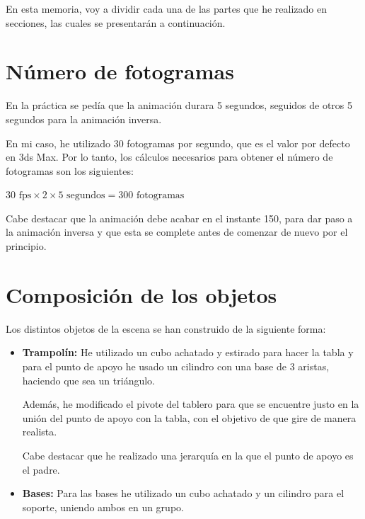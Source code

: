 \documentclass{article}
\begin{document}
\bigskip

En esta memoria, voy a dividir cada una de las partes que he realizado en secciones, las cuales se presentarán a continuación.

\section{Número de fotogramas}

En la práctica se pedía que la animación durara 5 segundos, seguidos de otros 5 segundos para la animación inversa. 

\bigskip

En mi caso, he utilizado 30 fotogramas por segundo, que es el valor por defecto en 3ds Max. Por lo tanto, los cálculos necesarios para obtener el número de fotogramas son los siguientes:

\bigskip

$30 \text{ fps} \times 2 \times 5 \text{ segundos} = 300 \text{ fotogramas} $

\bigskip

Cabe destacar que la animación debe acabar en el instante 150, para dar paso a la animación inversa y que esta se complete antes de comenzar de nuevo por el principio.

\section{Composición de los objetos}

Los distintos objetos de la escena se han construido de la siguiente forma:

\begin{itemize}
    \item \textbf{Trampolín: }He utilizado un cubo achatado y estirado para hacer la tabla y para el punto de apoyo he usado un cilindro con una base de 3 aristas, haciendo que sea un triángulo.
    
    Además, he modificado el pivote del tablero para que se encuentre justo en la unión del punto de apoyo con la tabla, con el objetivo de que gire de manera realista.

    Cabe destacar que he realizado una jerarquía en la que el punto de apoyo es el padre.

    \item \textbf{Bases: }Para las bases he utilizado un cubo achatado y un cilindro para el soporte, uniendo ambos en un grupo.
\end{itemize}
\end{document}
